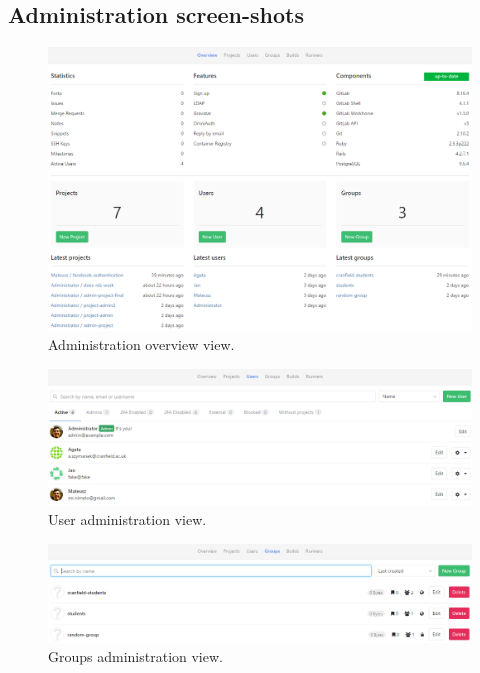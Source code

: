 \begin{appendix}
	\chapter{Administration screen-shots}
		\begin{figure}[!htbp]
			\centering
			\includegraphics[width=1\textwidth]{img/ug-administartion/overview}
			\caption{Administration overview view.}
			\label{fig:administration-overview-view}
		\end{figure}		
		\begin{figure}[!htbp]
			\centering
			\includegraphics[width=1\textwidth]{img/ug-administartion/users}
			\caption{User administration view.}
			\label{fig:user-administration-view}
		\end{figure}
		\begin{figure}[!htbp]
			\centering
			\includegraphics[width=1\textwidth]{img/ug-administartion/groups}
			\caption{Groups administration view.}
			\label{fig:groups-administration-view}

\end{figure}
\end{appendix}

